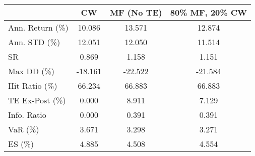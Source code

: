 \begin{tabular}{lccc}
\toprule
{} &      CW &  MF (No TE) &  80\% MF, 20\% CW \\
\midrule
Ann. Return (\%) &  10.086 &      13.571 &          12.874 \\
Ann. STD (\%)    &  12.051 &      12.050 &          11.514 \\
SR              &   0.869 &       1.158 &           1.151 \\
Max DD (\%)      & -18.161 &     -22.522 &         -21.584 \\
Hit Ratio (\%)   &  66.234 &      66.883 &          66.883 \\
TE Ex-Post (\%)  &   0.000 &       8.911 &           7.129 \\
Info. Ratio     &   0.000 &       0.391 &           0.391 \\
VaR (\%)         &   3.671 &       3.298 &           3.271 \\
ES (\%)          &   4.885 &       4.508 &           4.554 \\
\bottomrule
\end{tabular}
